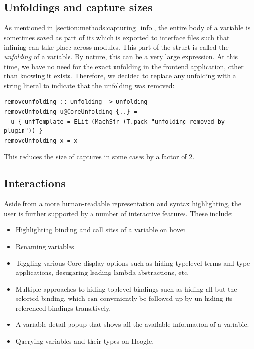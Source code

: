 \subsection{Unfoldings and capture sizes}

As mentioned in \cref{section:methods:capturing_info}, the entire body of a variable is sometimes saved as part
of its  which is exported to interface files such that inlining can take place across modules.
This part of the  struct is called the \textit{unfolding} of a variable.
By nature, this can be a very large expression. At this time, we have no
need for the exact unfolding in the frontend application, other than knowing it exists. Therefore, we decided 
to replace any unfolding with a string literal to indicate that the unfolding was removed:

\begin{listing}[H]
\begin{verbatim}
removeUnfolding :: Unfolding -> Unfolding
removeUnfolding u@CoreUnfolding {..} = 
  u { unfTemplate = ELit (MachStr (T.pack "unfolding removed by plugin")) }
removeUnfolding x = x
\end{verbatim}
\end{listing}

This reduces the size of captures in some cases by a factor of 2.

\subsection{Interactions}

Aside from a more human-readable representation and syntax highlighting, the user is further supported by
a number of interactive features. These include:

\begin{itemize}
  \item Highlighting binding and call sites of a variable on hover
  \item Renaming variables
  \item Toggling various Core display options such as hiding typelevel terms and type applications, desugaring
        leading lambda abstractions, etc.
  \item Multiple approaches to hiding toplevel bindings such as hiding all but the selected binding, which
        can conveniently be followed up by un-hiding its referenced bindings transitively.
  \item A variable detail popup that shows all the available information of a variable.
  \item Querying variables and their types on Hoogle.
\end{itemize}

